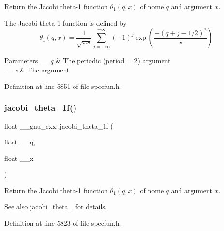 Return the Jacobi theta-\/1 function $ \theta_1(q,x) $ of nome $ q $ and argument $ x $.

The Jacobi theta-\/1 function is defined by \[ \theta_1(q,x) = \frac{1}{\sqrt{\pi x}} \sum_{j=-\infty}^{+\infty} (-1)^j \exp\left( \frac{-(q + j - 1/2)^2}{x} \right) \]


\begin{DoxyParams}{Parameters}
{\em \+\_\+\+\_\+q} & The periodic (period = 2) argument \\
\hline
{\em \+\_\+\+\_\+x} & The argument \\
\hline
\end{DoxyParams}


Definition at line 5851 of file specfun.\+h.

\mbox{\label{group__gnu__math__spec__func_gacccd2107c26e39400e589a59e0af674a}} 
\subsubsection{\texorpdfstring{jacobi\+\_\+theta\+\_\+1f()}{jacobi\_theta\_1f()}}
{\footnotesize\ttfamily float \+\_\+\+\_\+gnu\+\_\+cxx\+::jacobi\+\_\+theta\+\_\+1f (\begin{DoxyParamCaption}\item[{float}]{\+\_\+\+\_\+q,  }\item[{float}]{\+\_\+\+\_\+x }\end{DoxyParamCaption})\hspace{0.3cm}{\ttfamily [inline]}}

Return the Jacobi theta-\/1 function $ \theta_1(q,x) $ of nome $ q $ and argument $ x $.

\begin{DoxySeeAlso}{See also}
\hyperlink{group__gnu__math__spec__func_ga996ca8c1fff75e2d4f196e99e0919933}{jacobi\+\_\+theta\+\_} for details. 
\end{DoxySeeAlso}


Definition at line 5823 of file specfun.\+h.

\mbox{\label{group__gnu__math__spec__func_ga823eba555ecac89556a0f4c1e62dbc5a}} 
